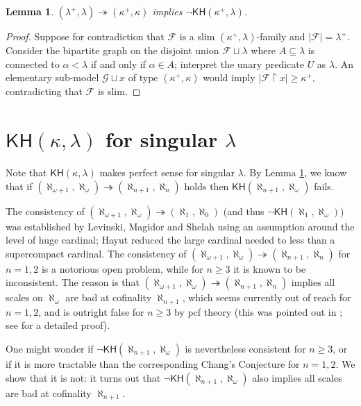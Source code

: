 \documentclass[10pt,reqno]{amsart}
\theoremstyle{plain}
\newtheorem{lemma}[theorem]{Lemma}
\theoremstyle{definition}
\theoremstyle{remark}
\begin{document}
\begin{lemma}\label{Chang_imply_KH}
$(\lambda^+,\lambda)\twoheadrightarrow(\kappa^+,\kappa)$ implies $\lnot\mathsf{KH}(\kappa^+,\lambda)$.
\end{lemma}
\begin{proof}
Suppose for contradiction that $\mathcal{F}$ is a slim $(\kappa^+,\lambda)$-family and $|\mathcal{F}|=\lambda^+$. Consider the bipartite graph on the disjoint union $\mathcal{F}\sqcup\lambda$ where $A\subseteq\lambda$ is connected to $\alpha<\lambda$ if and only if $\alpha\in A$; interpret the unary predicate $U$ as $\lambda$. An elementary sub-model $\mathcal{G}\sqcup x$ of type $(\kappa^+,\kappa)$ would imply $|\mathcal{F}\upharpoonright x|\geq\kappa^+$, contradicting that $\mathcal{F}$ is slim.
\end{proof}







\section{$\mathsf{KH}(\kappa,\lambda)$ for singular $\lambda$}

Note that $\mathsf{KH}(\kappa,\lambda)$ makes perfect sense for singular $\lambda$. By Lemma \ref{Chang_imply_KH}, we know that if $(\aleph_{\omega+1},\aleph_\omega)\twoheadrightarrow(\aleph_{n+1},\aleph_n)$ holds then $\mathsf{KH}(\aleph_{n+1},\aleph_\omega)$ fails. 

The consistency of $(\aleph_{\omega+1},\aleph_\omega)\twoheadrightarrow(\aleph_{1},\aleph_0)$ (and thus $\lnot\mathsf{KH}(\aleph_1,\aleph_\omega)$) was established by Levinski, Magidor and Shelah \cite{levinski1990chang} using an assumption around the level of huge cardinal; Hayut \cite{hayut2017chang} reduced the large cardinal needed to less than a supercompact cardinal. The consistency of $(\aleph_{\omega+1},\aleph_\omega)\twoheadrightarrow(\aleph_{n+1},\aleph_n)$ for $n=1,2$ is a notorious open problem, while for $n\geq 3$ it is known to be inconsistent. The reason is that $(\aleph_{\omega+1},\aleph_\omega)\twoheadrightarrow(\aleph_{n+1},\aleph_n)$ implies all scales on $\aleph_\omega$ are bad at cofinality $\aleph_{n+1}$, which seems currently out of reach for $n=1,2$, and is outright false for $n\geq 3$ by pcf theory (this was pointed out in \cite{sharon-viale2010}; see \cite{cummings_notes} for a detailed proof).

One might wonder if $\lnot\mathsf{KH}(\aleph_{n+1},\aleph_\omega)$ is nevertheless consistent for $n\geq 3$, or if it is more tractable than the corresponding Chang's Conjecture for $n=1,2$. We show that it is not: it turns out that $\lnot\mathsf{KH}(\aleph_{n+1},\aleph_\omega)$ also implies all scales are bad at cofinality $\aleph_{n+1}$.
\end{document}
